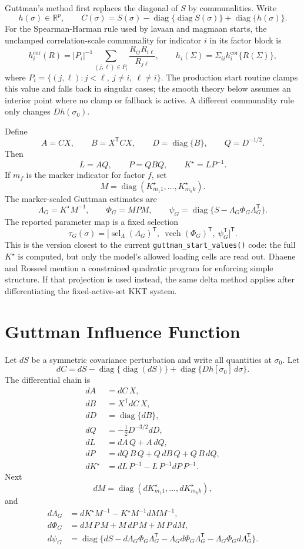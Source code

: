 \documentclass[11pt]{article}
\newcommand{\T}{^{\mathsf T}}
\newcommand{\diag}{\operatorname{diag}}
\newcommand{\vech}{\operatorname{vech}}
\theoremstyle{plain}
\theoremstyle{remark}
\begin{document}
Guttman's method first replaces the diagonal of \(S\) by communalities. Write
\[
  h(\sigma)\in\mathbb{R}^p,\qquad
  C(\sigma)=S(\sigma)-\diag\{\diag S(\sigma)\}+\diag\{h(\sigma)\}.
\]
For the Spearman-Harman rule used by lavaan and magmaan starts, the unclamped
correlation-scale communality for indicator \(i\) in its factor block is
\[
  h_i^{\mathrm{cor}}(R)
    =
  {|P_i|}^{-1}\sum_{(j,\ell)\in P_i}
    \frac{R_{ij}R_{i\ell}}{R_{j\ell}},
  \qquad
  h_i(\Sigma)=\Sigma_{ii}h_i^{\mathrm{cor}}\{R(\Sigma)\},
\]
where \(P_i=\{(j,\ell):j<\ell,\ j\ne i,\ \ell\ne i\}\). The production start
routine clamps this value and falls back in singular cases; the smooth theory
below assumes an interior point where no clamp or fallback is active. A
different communality rule only changes \(Dh(\sigma_0)\).

Define
\[
  A=CX,\qquad
  B=X\T C X,\qquad
  D=\diag\{B\},\qquad
  Q=D^{-1/2}.
\]
Then
\[
  L=AQ,\qquad
  P=QBQ,\qquad
  K^\star=LP^{-1}.
\]
If \(m_f\) is the marker indicator for factor \(f\), set
\[
  M=\diag(K^\star_{m_1 1},\ldots,K^\star_{m_k k}).
\]
The marker-scaled Guttman estimates are
\[
  \Lambda_G=K^\star M^{-1},
  \qquad
  \Phi_G=MPM,
  \qquad
  \psi_G=\diag\{S-\Lambda_G\Phi_G\Lambda_G\T\}.
\]
The reported parameter map is a fixed selection
\[
  \tau_G(\sigma)
    =
  \bigl[
    \operatorname{sel}_{\Lambda}(\Lambda_G)\T,\ 
    \vech(\Phi_G)\T,\ 
    \psi_G\T
  \bigr]\T .
\]
This is the version closest to the current \texttt{guttman\_start\_values()}
code: the full \(K^\star\) is computed, but only the model's allowed loading
cells are read out. Dhaene and Rosseel mention a constrained quadratic program
for enforcing simple structure. If that projection is used instead, the same
delta method applies after differentiating the fixed-active-set KKT system.

\section{Guttman Influence Function}

Let \(dS\) be a symmetric covariance perturbation and write all quantities at
\(\sigma_0\). Let
\[
  dC=dS-\diag\{\diag(dS)\}+\diag\{Dh[\sigma_0]\,d\sigma\}.
\]
The differential chain is
\[
\begin{aligned}
  dA &= dC\,X,\\
  dB &= X\T dC\,X,\\
  dD &= \diag\{dB\},\\
  dQ &= -\frac12 D^{-3/2}dD,\\
  dL &= dA\,Q+A\,dQ,\\
  dP &= dQ\,B\,Q+Q\,dB\,Q+Q\,B\,dQ,\\
  dK^\star &= dL\,P^{-1}-L\,P^{-1}dP\,P^{-1}.
\end{aligned}
\]
Next
\[
  dM=\diag(dK^\star_{m_1 1},\ldots,dK^\star_{m_k k}),
\]
and
\[
\begin{aligned}
  d\Lambda_G
    &= dK^\star M^{-1}-K^\star M^{-1}dM M^{-1},\\
  d\Phi_G
    &= dM\,P\,M+M\,dP\,M+M\,P\,dM,\\
  d\psi_G
    &=
  \diag\{dS
    -d\Lambda_G\Phi_G\Lambda_G\T
    -\Lambda_G d\Phi_G\Lambda_G\T
    -\Lambda_G\Phi_G d\Lambda_G\T\}.
\end{aligned}
\]
\end{document}
